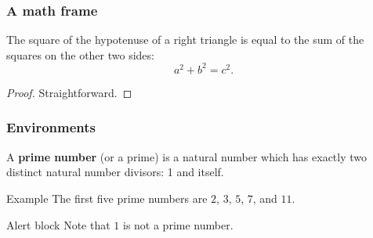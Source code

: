 \documentclass[pdflatex,compress]{beamer}
\begin{document}
\begin{frame}
\frametitle{A math frame}

\begin{theorem}[Pythagoras]
The square of the hypotenuse of a \alert{right} triangle is equal to the sum of the squares on the other two sides:
\[
a^2 + b^2 = c^2.
\]
\end{theorem}

\begin{proof}
Straightforward.
\end{proof}

\end{frame}


\begin{frame}
\frametitle{Environments}

\begin{definition}
A \textbf{prime number} (or a prime) is a natural number which has exactly two distinct natural number divisors: 1 and itself.
\end{definition}

\begin{exampleblock}{Example}
The first five prime numbers are $2$, $3$, $5$, $7$, and $11$.
\end{exampleblock}

\begin{alertblock}{Alert block}
Note that $1$ is not a prime number.
\end{alertblock}

\end{frame}
\end{document}
